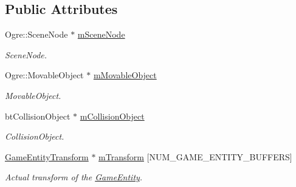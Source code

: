 \subsection*{Public Attributes}
\begin{DoxyCompactItemize}
\item 
\mbox{\label{struct_common_1_1_game_entity_ad6d1c510b4eb3e83e26c2fe78f5ea55c}} 
Ogre\+::\+Scene\+Node $\ast$ \hyperlink{struct_common_1_1_game_entity_ad6d1c510b4eb3e83e26c2fe78f5ea55c}{m\+Scene\+Node}
\begin{DoxyCompactList}\small\item\em Scene\+Node. \end{DoxyCompactList}\item 
\mbox{\label{struct_common_1_1_game_entity_aa7394d089e8ddccaeaafd06ced6d2b54}} 
Ogre\+::\+Movable\+Object $\ast$ \hyperlink{struct_common_1_1_game_entity_aa7394d089e8ddccaeaafd06ced6d2b54}{m\+Movable\+Object}
\begin{DoxyCompactList}\small\item\em Movable\+Object. \end{DoxyCompactList}\item 
\mbox{\label{struct_common_1_1_game_entity_afa2c88a6b49500a16cba74721a099b84}} 
bt\+Collision\+Object $\ast$ \hyperlink{struct_common_1_1_game_entity_afa2c88a6b49500a16cba74721a099b84}{m\+Collision\+Object}
\begin{DoxyCompactList}\small\item\em Collision\+Object. \end{DoxyCompactList}\item 
\mbox{\label{struct_common_1_1_game_entity_a36dc8cb7923177eb631dc333e37e22f9}} 
\hyperlink{struct_common_1_1_game_entity_transform}{Game\+Entity\+Transform} $\ast$ \hyperlink{struct_common_1_1_game_entity_a36dc8cb7923177eb631dc333e37e22f9}{m\+Transform} \mbox{[}N\+U\+M\+\_\+\+G\+A\+M\+E\+\_\+\+E\+N\+T\+I\+T\+Y\+\_\+\+B\+U\+F\+F\+E\+RS\mbox{]}
\begin{DoxyCompactList}\small\item\em Actual transform of the \hyperlink{struct_common_1_1_game_entity}{Game\+Entity}. \end{DoxyCompactList}\item 

\end{DoxyCompactItemize}
